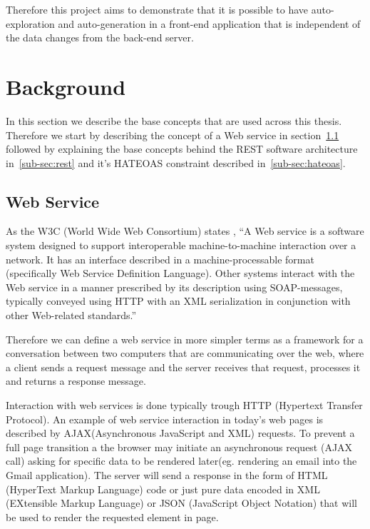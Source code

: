 Therefore this project aims to demonstrate that it is possible to have auto-exploration and auto-generation in a front-end application that is independent of the data changes from the back-end server.


\section{Background}
\label{sec:background}

In this section we describe the base concepts that are used across this thesis. Therefore we start by describing the concept of a Web service in section~\ref{sub-sec:web-service} followed by explaining the base concepts behind the REST software architecture in~\ref{sub-sec:rest} and it's HATEOAS constraint described in~\ref{sub-sec:hateoas}.

\subsection{Web Service}
\label{sub-sec:web-service}

As the W3C (World Wide Web Consortium) states \cite{W3C}, ``A Web service is a software system designed to support interoperable machine-to-machine interaction over a network. It has an interface described in a machine-processable format (specifically Web Service Definition Language). Other systems interact with the Web service in a manner prescribed by its description using SOAP-messages, typically conveyed using HTTP with an XML serialization in conjunction with other Web-related standards.'' 

Therefore we can define a web service in more simpler terms as a framework for a conversation between two computers that are communicating over the web, where a client sends a request message and the server receives that request, processes it and returns a response message.

Interaction with web services is done typically trough HTTP (Hypertext Transfer Protocol). An example of web service interaction in today's web pages is described by AJAX(Asynchronous JavaScript and XML) requests.   To prevent a full page transition a the browser may initiate an asynchronous request (AJAX call) asking for specific data to be rendered later(eg. rendering an email into the Gmail application). The server will send a response in the form of HTML (HyperText Markup Language) code or just pure data encoded in XML (EXtensible Markup Language) or JSON (JavaScript Object Notation) that will be used to render the requested element in page.

